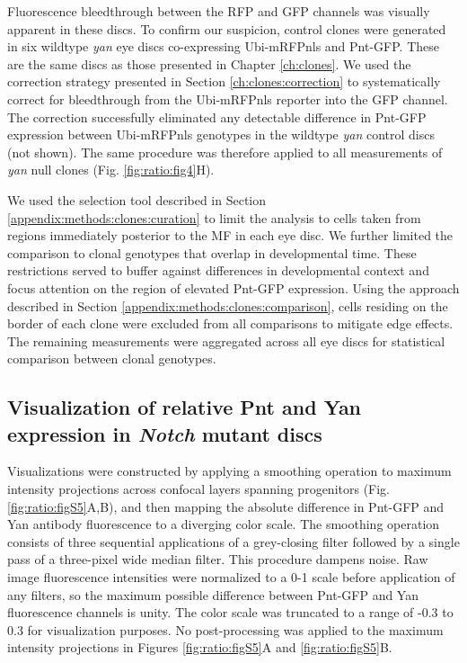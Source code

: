 Fluorescence bleedthrough between the RFP and GFP channels was visually apparent in these discs. To confirm our suspicion, control clones were generated in six wildtype \textit{yan} eye discs co-expressing Ubi-mRFPnls and Pnt-GFP. These are the same discs as those presented in Chapter \ref{ch:clones}. We used the correction strategy presented in Section \ref{ch:clones:correction} to systematically correct for bleedthrough from the Ubi-mRFPnls reporter into the GFP channel. The correction successfully eliminated any detectable difference in Pnt-GFP expression between Ubi-mRFPnls genotypes in the wildtype \textit{yan} control discs (not shown). The same procedure was therefore applied to all measurements of \textit{yan} null clones (Fig. \ref{fig:ratio:fig4}H).

We used the selection tool described in Section \ref{appendix:methods:clones:curation} to limit the analysis to cells taken from regions immediately posterior to the MF in each eye disc. We further limited the comparison to clonal genotypes that overlap in developmental time. These restrictions served to buffer against differences in developmental context and focus attention on the region of elevated Pnt-GFP expression. Using the approach described in Section \ref{appendix:methods:clones:comparison}, cells residing on the border of each clone were excluded from all comparisons to mitigate edge effects. The remaining measurements were aggregated across all eye discs for statistical comparison between clonal genotypes.

\subsection{Visualization of relative Pnt and Yan expression in \textit{Notch} mutant discs}
\label{appendix:methods:ratio:notch_images}

Visualizations were constructed by applying a smoothing operation to maximum intensity projections across confocal layers spanning progenitors (Fig. \ref{fig:ratio:figS5}A,B), and then mapping the absolute difference in Pnt-GFP and Yan antibody fluorescence to a diverging color scale. The smoothing operation consists of three sequential applications of a grey-closing filter followed by a single pass of a three-pixel wide median filter. This procedure dampens noise. Raw image fluorescence intensities were normalized to a 0-1 scale before application of any filters, so the maximum possible difference between Pnt-GFP and Yan fluorescence channels is unity. The color scale was truncated to a range of -0.3 to 0.3 for visualization purposes. No post-processing was applied to the maximum intensity projections in Figures \ref{fig:ratio:figS5}A and \ref{fig:ratio:figS5}B.

